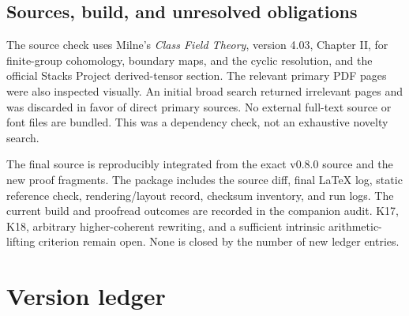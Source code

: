 \documentclass[11pt]{article}
\theoremstyle{definition}
\theoremstyle{remark}
\begin{document}
\subsection{Sources, build, and unresolved obligations}
The source check uses Milne's \emph{Class Field Theory}, version 4.03, Chapter II, for finite-group cohomology, boundary maps, and the cyclic resolution, and the official Stacks Project derived-tensor section. The relevant primary PDF pages were also inspected visually. An initial broad search returned irrelevant pages and was discarded in favor of direct primary sources. No external full-text source or font files are bundled. This was a dependency check, not an exhaustive novelty search.

The final source is reproducibly integrated from the exact v0.8.0 source and the new proof fragments. The package includes the source diff, final LaTeX log, static reference check, rendering/layout record, checksum inventory, and run logs. The current build and proofread outcomes are recorded in the companion audit. K17, K18, arbitrary higher-coherent rewriting, and a sufficient intrinsic arithmetic-lifting criterion remain open. None is closed by the number of new ledger entries.


\section{Version ledger}
\end{document}
